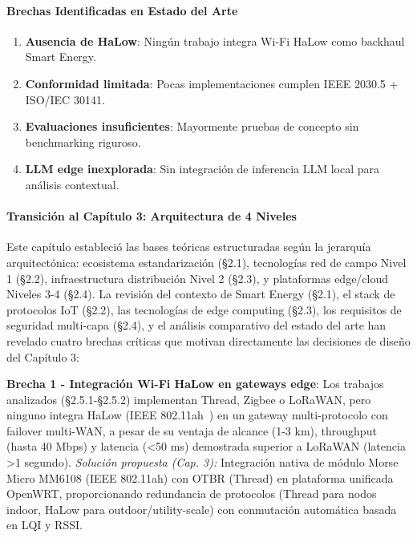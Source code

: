 \paragraph{Brechas Identificadas en Estado del Arte}

\begin{enumerate}
\item \textbf{Ausencia de HaLow}: Ningún trabajo integra Wi-Fi HaLow como backhaul Smart Energy.
\item \textbf{Conformidad limitada}: Pocas implementaciones cumplen IEEE 2030.5 + ISO/IEC 30141.
\item \textbf{Evaluaciones insuficientes}: Mayormente pruebas de concepto sin benchmarking riguroso.
\item \textbf{LLM edge inexplorada}: Sin integración de inferencia LLM local para análisis contextual.
\end{enumerate}

\paragraph{Transición al Capítulo 3: Arquitectura de 4 Niveles}

Este capítulo estableció las bases teóricas estructuradas según la jerarquía arquitectónica: ecosistema estandarización (§2.1), tecnologías red de campo Nivel 1 (§2.2), infraestructura distribución Nivel 2 (§2.3), y plataformas edge/cloud Niveles 3-4 (§2.4). La revisión del contexto de Smart Energy (§2.1), el stack de protocolos IoT (§2.2), las tecnologías de edge computing (§2.3), los requisitos de seguridad multi-capa (§2.4), y el análisis comparativo del estado del arte han revelado cuatro brechas críticas que motivan directamente las decisiones de diseño del Capítulo 3:

\textbf{Brecha 1 - Integración Wi-Fi HaLow en gateways edge}: Los trabajos analizados (§2.5.1-§2.5.2) implementan Thread, Zigbee o LoRaWAN, pero ninguno integra HaLow (IEEE 802.11ah~\cite{ieee80211ah2020}) en un gateway multi-protocolo con failover multi-WAN, a pesar de su ventaja de alcance (1-3 km), throughput (hasta 40 Mbps) y latencia (<50 ms) demostrada superior a LoRaWAN (latencia >1 segundo). \textit{Solución propuesta (Cap. 3):} Integración nativa de módulo Morse Micro MM6108 (IEEE 802.11ah) con OTBR (Thread) en plataforma unificada OpenWRT, proporcionando redundancia de protocolos (Thread para nodos indoor, HaLow para outdoor/utility-scale) con conmutación automática basada en LQI y RSSI.

